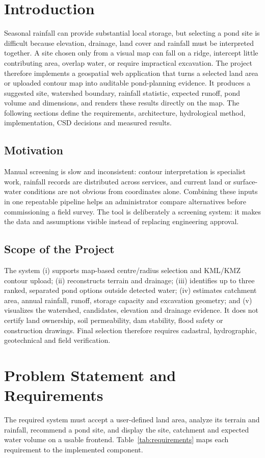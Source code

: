 \documentclass[manuscript,screen,review]{acmart}
\begin{document}
\section{Introduction}
Seasonal rainfall can provide substantial local storage, but selecting a pond site is difficult because elevation, drainage, land cover and rainfall must be interpreted together. A site chosen only from a visual map can fall on a ridge, intercept little contributing area, overlap water, or require impractical excavation. The project therefore implements a geospatial web application that turns a selected land area or uploaded contour map into auditable pond-planning evidence. It produces a suggested site, watershed boundary, rainfall statistic, expected runoff, pond volume and dimensions, and renders these results directly on the map. The following sections define the requirements, architecture, hydrological method, implementation, CSD decisions and measured results.

\subsection{Motivation}
Manual screening is slow and inconsistent: contour interpretation is specialist work, rainfall records are distributed across services, and current land or surface-water conditions are not obvious from coordinates alone. Combining these inputs in one repeatable pipeline helps an administrator compare alternatives before commissioning a field survey. The tool is deliberately a screening system: it makes the data and assumptions visible instead of replacing engineering approval.

\subsection{Scope of the Project}
The system (i) supports map-based centre/radius selection and KML/KMZ contour upload; (ii) reconstructs terrain and drainage; (iii) identifies up to three ranked, separated pond options outside detected water; (iv) estimates catchment area, annual rainfall, runoff, storage capacity and excavation geometry; and (v) visualizes the watershed, candidates, elevation and drainage evidence. It does not certify land ownership, soil permeability, dam stability, flood safety or construction drawings. Final selection therefore requires cadastral, hydrographic, geotechnical and field verification.

\section{Problem Statement and Requirements}
The required system must accept a user-defined land area, analyze its terrain and rainfall, recommend a pond site, and display the site, catchment and expected water volume on a usable frontend. Table~\ref{tab:requirements} maps each requirement to the implemented component.
\end{document}
